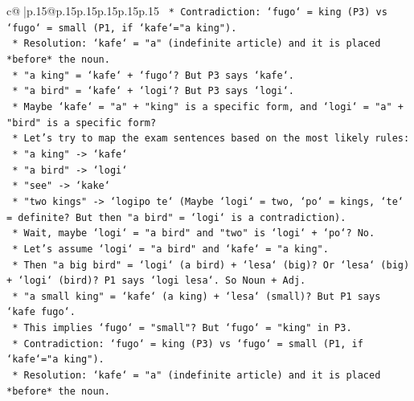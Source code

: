\documentclass{article}
\begin{document}
{\begin{supertabular}{c@{$\;$}|p{.15\linewidth}@{}p{.15\linewidth}p{.15\linewidth}p{.15\linewidth}p{.15\linewidth}p{.15\linewidth}}
{{{\texttt{                            *   Contradiction: `fugo` = king (P3) vs `fugo` = small (P1, if `kafe`="a king").} \\
\texttt{                            *   Resolution: `kafe` = "a" (indefinite article) and it is placed *before* the noun.} \\
\texttt{                                *   "a king" = `kafe` + `fugo`? But P3 says `kafe`.} \\
\texttt{                                *   "a bird" = `kafe` + `logi`? But P3 says `logi`.} \\
\texttt{                            *   Maybe `kafe` = "a" + "king" is a specific form, and `logi` = "a" + "bird" is a specific form?} \\
\texttt{                            *   Let's try to map the exam sentences based on the most likely rules:} \\
\texttt{                                *   "a king" {-}> `kafe`} \\
\texttt{                                *   "a bird" {-}> `logi`} \\
\texttt{                                *   "see" {-}> `kake`} \\
\texttt{                                *   "two kings" {-}> `logipo te` (Maybe `logi` = two, `po` = kings, `te` = definite? But then "a bird" = `logi` is a contradiction).} \\
\texttt{                                *   Wait, maybe `logi` = "a bird" and "two" is `logi` + `po`? No.} \\
\texttt{                                *   Let's assume `logi` = "a bird" and `kafe` = "a king".} \\
\texttt{                                *   Then "a big bird" = `logi` (a bird) + `lesa` (big)? Or `lesa` (big) + `logi` (bird)? P1 says `logi lesa`. So Noun + Adj.} \\
\texttt{                                *   "a small king" = `kafe` (a king) + `lesa` (small)? But P1 says `kafe fugo`.} \\
\texttt{                                *   This implies `fugo` = "small"? But `fugo` = "king" in P3.} \\
\texttt{                                *   Contradiction: `fugo` = king (P3) vs `fugo` = small (P1, if `kafe`="a king").} \\
\texttt{                                *   Resolution: `kafe` = "a" (indefinite article) and it is placed *before* the noun.} \\
}}}
\end{supertabular}}
\end{document}
